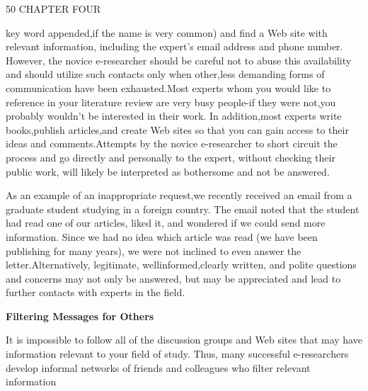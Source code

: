 \documentclass[8pt]{beamer}
\begin{document}
\begin{frame}
\hspace{-1cm}
50
\hspace{0.5cm}
CHAPTER FOUR
\vspace{3mm}

key word appended,if the name is very common) and find a Web site with relevant information, including the expert's email address and phone number. However, the novice e-researcher should be careful not to abuse this availability and should utilize such contacts only when other,less demanding forms of communication have been exhausted.Most experts whom you would like to reference in your literature review are very busy people-if they were not,you probably wouldn't be interested in their work. In addition,most experts write books,publish articles,and create Web sites so that you can gain access to their ideas and comments.Attempts by the novice e-researcher to short circuit the process and go directly and personally to the expert, without checking their public work, will likely be interpreted as bothersome and not be answered.

As an example of an inappropriate request,we recently received an email from a graduate student studying in a foreign country. The email noted that the student had read one of our articles, liked it, and wondered if we could send more information.
Since we had no idea which article was read (we have been publishing for many years), we were not inclined to even answer the letter.Alternatively, legitimate, wellinformed,clearly written, and polite questions and concerns may not only be answered,
but may be appreciated and lead to further contacts with experts in the field.

\vspace{3mm}
\hspace{-1cm}
\textbf{Filtering Messages for Others}
\vspace{3mm}

It is impossible to follow all of the discussion groups and Web sites that may have information relevant to your field of study. Thus, many successful e-researchers develop informal networks of friends and colleagues who filter relevant information

\end{frame}
\end{document}
